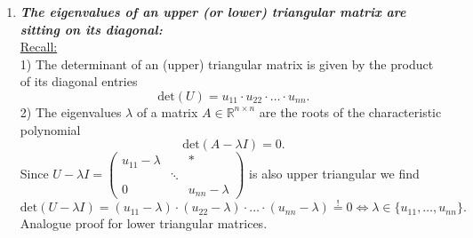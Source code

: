 {\begin{enumerate}
	\item \textbf{\textit{The eigenvalues of an upper (or lower) triangular matrix are sitting on its diagonal:}}\\ 
		\underline{Recall:} \\
1) The determinant of an (upper) triangular matrix is given by the product of its diagonal entries
$$
\text{det}(U)=u_{11}\cdot u_{22}\cdot\ldots\cdot u_{nn}.
$$
2) The eigenvalues $\lambda$ of a matrix $A\in\mathbb{R}^{n\times n}$ are the roots of the characteristic polynomial 
$$
\text{det}(A-\lambda I) = 0.
$$
Since $U-\lambda I = \begin{pmatrix}u_{11}-\lambda& &*\\ &\ddots& \\0& &u_{nn}-\lambda\end{pmatrix}$ is also upper triangular we find
$$
\text{det}(U-\lambda I)=(u_{11}-\lambda)\cdot(u_{22}-\lambda)\cdot\ldots\cdot(u_{nn}-\lambda)\stackrel{!}{=}0\Leftrightarrow \lambda\in\{u_{11},\dots,u_{nn}\}.
$$
Analogue proof for lower triangular matrices.
%
%

\end{enumerate}}
